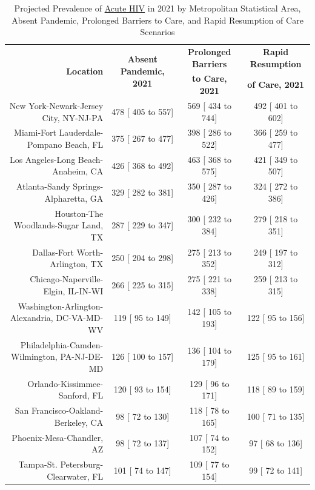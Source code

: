 \documentclass{article}
\begin{document}
\begin{table}[H]
	\caption{Projected Prevalence of \underline{Acute HIV} in 2021 by Metropolitan Statistical Area, Absent Pandemic, Prolonged Barriers to Care, and Rapid Resumption of Care Scenarios}
	\footnotesize
	\begin{tabular}{|r|c|c|c|}
		\hline
		\multirow{2}{*}{\textbf{Location}} & \multirow{2}{*}{\textbf{Absent Pandemic, 2021}} & \textbf{Prolonged Barriers} & \textbf{Rapid Resumption}\\
		&  & \textbf{to Care, 2021} & \textbf{of Care, 2021}\\
		\hline\hline
		New York-Newark-Jersey City, NY-NJ-PA &   478 [  405 to   557] &   569 [  434 to   744] &   492 [  401 to   602]\\
		Miami-Fort Lauderdale-Pompano Beach, FL &   375 [  267 to   477] &   398 [  286 to   522] &   366 [  259 to   477]\\
		Los Angeles-Long Beach-Anaheim, CA &   426 [  368 to   492] &   463 [  368 to   575] &   421 [  349 to   507]\\
		Atlanta-Sandy Springs-Alpharetta, GA &   329 [  282 to   381] &   350 [  287 to   426] &   324 [  272 to   386]\\
		Houston-The Woodlands-Sugar Land, TX &   287 [  229 to   347] &   300 [  232 to   384] &   279 [  218 to   351]\\
		Dallas-Fort Worth-Arlington, TX &   250 [  204 to   298] &   275 [  213 to   352] &   249 [  197 to   312]\\
		Chicago-Naperville-Elgin, IL-IN-WI &   266 [  225 to   315] &   275 [  221 to   338] &   259 [  213 to   315]\\
		Washington-Arlington-Alexandria, DC-VA-MD-WV &   119 [   95 to   149] &   142 [  105 to   193] &   122 [   95 to   156]\\
		Philadelphia-Camden-Wilmington, PA-NJ-DE-MD &   126 [  100 to   157] &   136 [  104 to   179] &   125 [   95 to   161]\\
		Orlando-Kissimmee-Sanford, FL &   120 [   93 to   154] &   129 [   96 to   171] &   118 [   89 to   159]\\
		San Francisco-Oakland-Berkeley, CA &    98 [   72 to   130] &   118 [   78 to   165] &   100 [   71 to   135]\\
		Phoenix-Mesa-Chandler, AZ &    98 [   72 to   137] &   107 [   74 to   152] &    97 [   68 to   136]\\
		Tampa-St. Petersburg-Clearwater, FL &   101 [   74 to   147] &   109 [   77 to   154] &    99 [   72 to   141]\\

\end{tabular}
\end{table}
\end{document}
